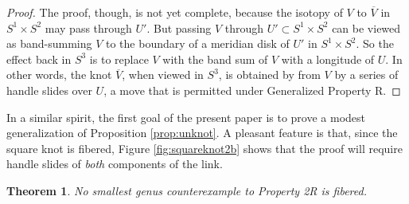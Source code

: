 \documentclass{amsart}
\newtheorem{thm}{Theorem}[section]
\begin{document}
\begin{proof}
The proof, though, is not yet complete, because the isotopy of $V$ to $\overline{V}$ in $S^1 \times S^2$ may pass through $U'$.  But passing $V$ through $U' \subset S^1 \times S^2$ can be viewed as band-summing $V$ to the boundary of a meridian disk of $U'$ in $S^1 \times S^2$.  So the effect back in $S^3$ is to replace $V$ with the band sum of $V$ with a longitude of $U$.  In other words, the knot $\overline{V}$, when viewed in $S^3$, is obtained by from $V$ by a series of handle slides over $U$, a move that is permitted under Generalized Property R.
\end{proof}

In a similar spirit, the first goal of the present paper is to prove a modest generalization of Proposition \ref{prop:unknot}.   A pleasant feature is that, since the square knot is fibered, Figure \ref{fig:squareknot2b} shows that the proof will require handle slides of {\em both} components of the link.

\begin{thm} \label{thm:main} No smallest genus counterexample to Property 2R is fibered.
\end{thm}
\end{document}
